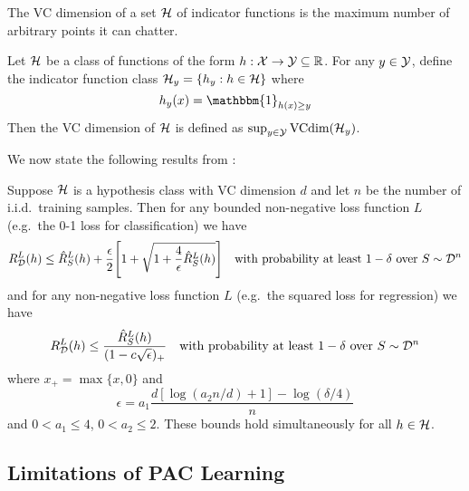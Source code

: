 \begin{definition}
  The VC dimension of a set $\mathcal{H}$ of indicator functions is the maximum number
  of arbitrary points it can chatter.
\end{definition}

\begin{definition}
  Let $\mathcal{H}$ be a class of functions of the form $h : \mathcal{X} \to \mathcal{Y} \subseteq \mathbb{R}$.
  For any $y \in \mathcal{Y}$, define the indicator function class $\mathcal{H}_y = \{h_y : h
  \in \mathcal{H}\}$ where
  \begin{equation}
    h_y(x) = \mathbbm{1}_{h(x) \geq y}
  \end{equation}
  Then the VC dimension of $\mathcal{H}$ is defined as $\sup_{y \in \mathcal{Y}}
  \text{VCdim}(\mathcal{H}_y)$.
\end{definition}

We now state the following results from \citet[Sections 4.3.1 and
4.3.2]{cherkassky2007learning}:

\begin{theorem}
  Suppose $\mathcal{H}$ is a hypothesis class with VC dimension $d$ and let $n$ be the
  number of i.i.d.\ training samples. Then for any bounded non-negative loss
  function $L$ (e.g.\ the 0-1 loss for classification) we have
  \begin{equation}
    \label{eq:generalization-classification}
    R_{\mathcal{D}}^L(h) \leq \hat{R}_S^L(h) + \frac{\epsilon}{2} \qty[1 + \sqrt{1 +
    \frac{4}{\epsilon} \hat{R}_S^L(h)}] \quad \text{with probability at least }
    1 - \delta \text{ over } S \sim \mathcal{D}^n
  \end{equation}
  and for any non-negative loss function $L$ (e.g.\ the squared loss for
  regression) we have
  \begin{equation}
    \label{eq:generalization-regression}
    R_{\mathcal{D}}^L(h) \leq \frac{\hat{R}_S^L(h)}{(1 - c \sqrt{\epsilon})_+} \quad
    \text{with probability at least } 1 - \delta \text{ over } S \sim \mathcal{D}^n
  \end{equation}
  where $x_+ = \max\{x, 0\}$ and
  \begin{equation}
    \epsilon = a_1 \frac{d [\log (a_2 n / d) + 1] - \log (\delta / 4)}{n}
  \end{equation}
  and $0 < a_1 \leq 4$, $0 < a_2 \leq 2$. These bounds hold simultaneously for
  all $h \in \mathcal{H}$.
\end{theorem}

\subsection{Limitations of PAC Learning}

